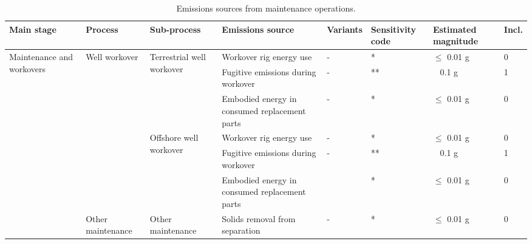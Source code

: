 \documentclass[11pt]{report}
\begin{document}
{{{{\begin{landscape}
\begin{table}
\begin{scriptsize}
\caption{Emissions sources from maintenance operations.}
\label{tab:maintenance_sources}
\begin{tabular}{|p{}|p{}|p{}|p{}|p{}|p{}|p{}|p{}|}
\hline
\textbf{Main stage} & \textbf{Process} & \textbf{Sub-process} & \textbf{Emissions source} & \textbf{Variants}& \textbf{Sensitivity code} & \textbf{Estimated magnitude} & \textbf{Incl.}\\
\hline
\multirow{7}{0.08\columnwidth}{Maintenance and workovers} & \multirow{6}{0.09\columnwidth}{Well workover} & \multirow{3}{0.12\columnwidth}{Terrestrial well workover} & Workover rig energy use & - & * & $\leq$ 0.01 g & 0\\
\cline{4-8}
& & & Fugitive emissions during workover & - & ** & ~ 0.1 g & 1\\
\cline{4-8}
& & & Embodied energy in consumed replacement parts & - & * & $\leq$ 0.01 g & 0\\
\cline{3-8}
& & \multirow{3}{0.12\columnwidth}{Offshore well workover} & Workover rig energy use & - & * & $\leq$ 0.01 g & 0\\
\cline{4-8}
& & & Fugitive emissions during workover & - & ** & ~ 0.1 g & 1\\
\cline{4-8}
& & & Embodied energy in consumed replacement parts & & * & $\leq$ 0.01 g & 0\\
\cline{2-8}
& Other maintenance & Other maintenance & Solids removal from separation & - & * & $\leq$ 0.01 g & 0\\
\hline
\end{tabular}
\end{scriptsize}
\end{table}



\end{landscape}}}}}
\end{document}
